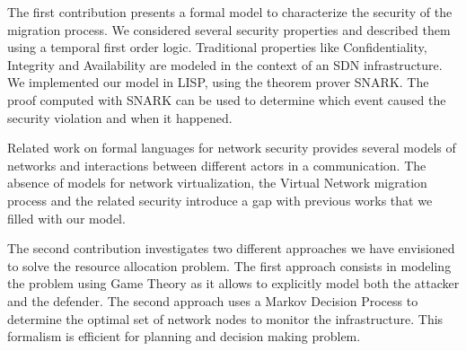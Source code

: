 The first contribution presents a formal model to characterize the security of the migration process. We considered several security properties and described them using a temporal first order logic. Traditional properties like Confidentiality, Integrity and Availability are modeled in the context of an SDN infrastructure.
We implemented our model in LISP, using the theorem prover SNARK.
The proof computed with SNARK can be used to determine which event caused the security violation and when it happened.

Related work on formal languages for network security provides several models of networks and interactions between different actors in a communication. The absence of models for network virtualization, the Virtual Network migration process and the related security introduce a gap with previous works that we filled with our model. 

The second contribution investigates two different approaches we have envisioned to solve the resource allocation problem. The first approach consists in modeling the problem using Game Theory as it allows to explicitly model both the attacker and the defender. The second approach uses a Markov Decision Process to determine the optimal set of network nodes to monitor the infrastructure. This formalism is efficient for planning and decision making problem.


